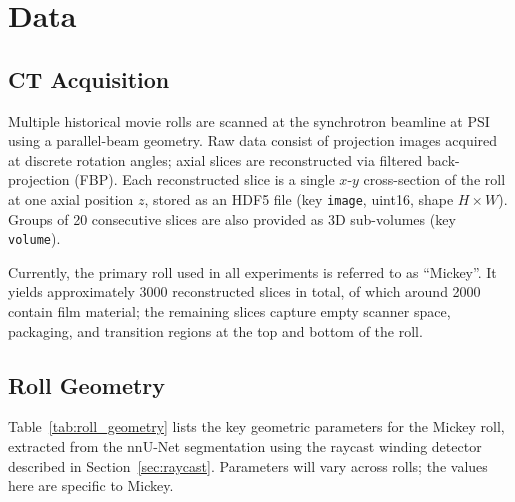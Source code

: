 \documentclass[11pt,a4paper]{article}
\begin{document}

\section{Data}

\subsection{CT Acquisition}

Multiple historical movie rolls are scanned at the synchrotron beamline at PSI using a parallel-beam geometry. Raw data consist of projection images acquired at discrete rotation angles; axial slices are reconstructed via filtered back-projection (FBP). Each reconstructed slice is a single $x$-$y$ cross-section of the roll at one axial position $z$, stored as an HDF5 file (key \texttt{image}, uint16, shape $H \times W$). Groups of 20 consecutive slices are also provided as 3D sub-volumes (key \texttt{volume}).

Currently, the primary roll used in all experiments is referred to as ``Mickey''. It yields approximately 3000 reconstructed slices in total, of which around 2000 contain film material; the remaining slices capture empty scanner space, packaging, and transition regions at the top and bottom of the roll. 

\subsection{Roll Geometry}

Table~\ref{tab:roll_geometry} lists the key geometric parameters for the Mickey roll, extracted from the nnU-Net segmentation using the raycast winding detector described in Section~\ref{sec:raycast}. Parameters will vary across rolls; the values here are specific to Mickey.
\end{document}
